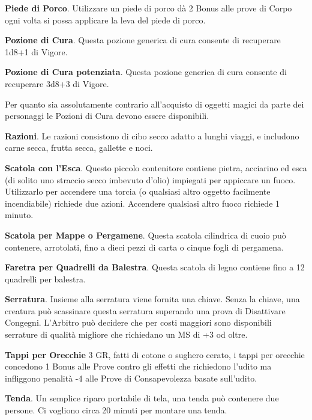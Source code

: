 \documentclass[12pt,a4paper,twoside,openany]{book}
\begin{document}
\begin{multicols}{2}
\textbf{Piede di Porco}. Utilizzare un piede di porco dà 2 Bonus alle prove di Corpo ogni volta si possa applicare la leva del piede di porco.

\textbf{Pozione di Cura}. Questa pozione generica di cura consente di recuperare 1d8+1 di Vigore.

\textbf{Pozione di Cura potenziata}. Questa pozione generica di cura consente di recuperare 3d8+3 di Vigore.

\begin{changemargin}{0.3cm}{0.3cm}\begin{narratore} Per quanto sia assolutamente contrario all'acquisto di oggetti magici da parte dei personaggi le Pozioni di Cura devono essere disponibili.
\end{narratore}\end{changemargin}

\textbf{Razioni}. Le razioni consistono di cibo secco adatto a lunghi viaggi, e includono carne secca, frutta secca, gallette e noci.

\textbf{Scatola con l’Esca}. Questo piccolo contenitore contiene pietra, acciarino ed esca (di solito uno straccio secco imbevuto d’olio) impiegati per appiccare un fuoco. Utilizzarlo per accendere una torcia (o qualsiasi altro oggetto facilmente incendiabile) richiede due azioni. Accendere qualsiasi altro fuoco richiede 1 minuto.

\textbf{Scatola per Mappe o Pergamene}. Questa scatola cilindrica di cuoio può contenere, arrotolati, fino a dieci pezzi di carta o cinque fogli di pergamena.

\textbf{Faretra per Quadrelli da Balestra}. Questa scatola di legno contiene fino a 12 quadrelli per balestra.

\textbf{Serratura}. Insieme alla serratura viene fornita una chiave. Senza la chiave, una creatura può scassinare questa serratura superando una prova di Disattivare Congegni. L'Arbitro può decidere che per costi maggiori sono disponibili serrature di qualità migliore che richiedano un MS di +3 od oltre.

\textbf{Tappi per Orecchie} 3 GR, fatti di cotone o sughero cerato, i tappi per orecchie concedono 1 Bonus alle Prove contro gli effetti che richiedono l'udito ma infliggono penalità -4 alle Prove di Consapevolezza basate sull'udito.

\textbf{Tenda}. Un semplice riparo portabile di tela, una tenda può contenere due persone. Ci vogliono circa 20 minuti per montare una tenda.


\end{multicols}
\end{document}

